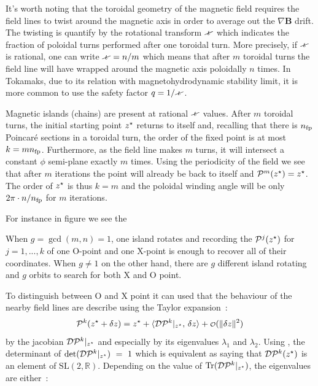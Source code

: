 It's worth noting that the toroidal geometry of the magnetic field requires the field lines to twist around the magnetic axis in order to average out the $\nabla\textbf{B}$ drift. The twisting is quantify by the rotational transform $\iotaslash$ which indicates the fraction of poloidal turns
performed after one toroidal turn. More precisely, if $\iotaslash$ is rational, one can write $\iotaslash = n/m$ which means that after $m$ toroidal turns the field line will have wrapped around the magnetic axis poloidally $n$ times. In Tokamaks, due to its relation with magnetohydrodynamic stability limit, it is more common to use the safety factor $q=1/\iotaslash$.

Magnetic islands (chains) are present at rational $\iotaslash$ values. After $m$ toroidal turns, the initial starting point $z^\star$ returns to itself and, recalling that there is $n_\text{fp}$ Poincaré sections in a toroidal turn, the order of the fixed point is at most $k=mn_\text{fp}$. Furthermore, as the field line makes $m$ turns, it will intersect a constant $\phi$ semi-plane exactly $m$ times. Using the periodicity of the field we see that after $m$ iterations the point will already be back to itself and $\mathcal{P}^m(z^\star) = z^\star$. The order of $z^\star$ is thus $k=m$ and the poloidal winding angle will be only $2\pi\cdot n/n_\text{fp}$ for $m$ iterations. 

For instance in figure \figref{} we see the 

When $g = \gcd{(m,n)} = 1$, one island rotates and recording the $\mathcal{P}^j(z^\star)$ for $j = 1, ..., k$ 
of one O-point and one X-point is enough to recover all of their coordinates. When $g \neq 1$ on the other hand, there are $g$ different island rotating and $g$ orbits to search for both X and O point. 

To distinguish between O and X point it can used that the behaviour of the nearby field lines are describe using the Taylor expansion~:
\begin{equation*}
    \pmap^k(\z^\star+\delta \z) = \z^\star + \langle\dpmap^k\vert_{\z^\star},\, \delta\z\rangle + \smallO(\Vert\delta\z\Vert^2)
\end{equation*}
by the jacobian $\mathcal{D}\mathcal{P}^k\vert_{z^\star}$ and especially by its eigenvalues $\lambda_1$ and $\lambda_2$. Using , the determinant of $\text{det}(\mathcal{D}\mathcal{P}^k\vert_{z^\star})~=~1$ which is equivalent as saying that $\mathcal{D}\mathcal{P}^k(z^\star)$ is an element of $\text{SL}(2,\mathbb{R})$. Depending on the value of $\text{Tr}(\mathcal{D}\mathcal{P}^k\vert_{z^\star})$, the eigenvalues are either~:

